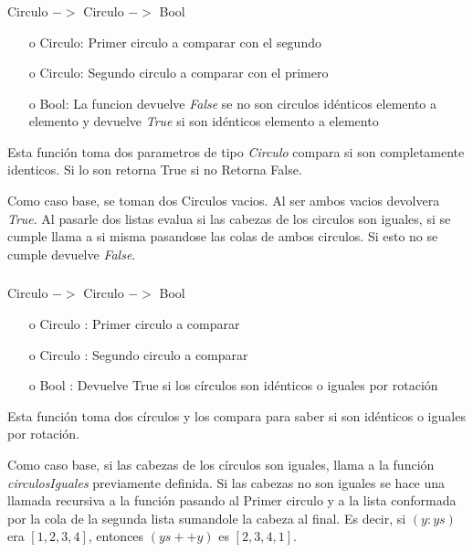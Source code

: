 \documentclass[10pt,journal]{IEEEtran}
\begin{document}
\subsubsection{\color{Red}{circulosIdenticos}}
\begin{description}[style=nextline]
        \item[\color{Green}{Signatura}] Circulo $->$ Circulo $->$ Bool  
        \begin{itemize}
        \item [o] Circulo: Primer circulo a comparar con el segundo 
        \item [o] Circulo: Segundo circulo a comparar con el primero
        \item [o] Bool: La funcion devuelve \textit{False} se no son circulos idénticos elemento a elemento y devuelve \textit{True} si son idénticos elemento a elemento
        \end{itemize}        
        
        \item[\color{Green}{Descripción}] Esta función toma dos parametros de tipo \textit{Circulo} compara si son completamente identicos. Si lo son retorna True si no Retorna False.  
        
        Como caso base, se toman dos Circulos vacios. Al ser ambos vacios devolvera \textit{True}. Al pasarle dos listas evalua si las cabezas de los circulos son iguales, si se cumple llama a si misma pasandose las colas de ambos circulos. Si esto no se cumple devuelve \textit{False}. 
\end{description}


\subsubsection{\color{Red}{circulosIgualesAux}}
\begin{description}[style=nextline]
        \item[\color{Green}{Signatura}] Circulo $->$ Circulo $->$ Bool 
        \begin{itemize}
        \item [o] Circulo : Primer circulo a comparar
        \item [o] Circulo : Segundo circulo a comparar
        \item [o] Bool : Devuelve True si los círculos son idénticos o iguales por rotación
        \end{itemize}        
        
        \item[\color{Green}{Descripción}]Esta función toma dos círculos y los compara para saber si son idénticos o iguales por rotación.
        
        Como caso base, si las cabezas de los círculos son iguales, llama a la función \textit{circulosIguales} previamente definida. Si las cabezas no son iguales se hace una llamada recursiva a la función pasando al Primer circulo y a la lista conformada por la cola de la segunda lista sumandole la cabeza al final. Es decir, si $(y:ys)$ era $[1,2,3,4]$, entonces $(ys ++ y)$ es $[2,3,4,1]$.
        
    
\end{description}
\end{document}
